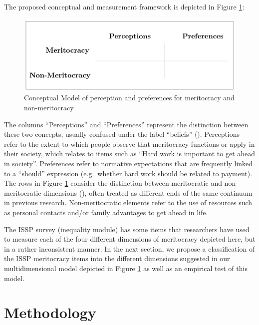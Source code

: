 \documentclass[
  10pt,
  a4paper,
]{article}
\begin{document}
The proposed conceptual and measurement framework is depicted in Figure \ref{fig:merit-model}:

\begin{figure}[H]

{\centering \includegraphics[width=0.85\linewidth]{input/images/Fig1.generalf} 

}

\caption{Conceptual Model of perception and preferences for meritocracy and non-meritocracy}\label{fig:merit-model}
\end{figure}

The columns ``Perceptions'' and ``Preferences'' represent the distinction between these two concepts, usually confused under the label ``beliefs'' (). Perceptions refer to the extent to which people observe that meritocracy functions or apply in their society, which relates to items such as ``Hard work is important to get ahead in society''. Preferences refer to normative expectations that are frequently linked to a ``should'' expression (e.g.~whether hard work should be related to payment). The rows in Figure \ref{fig:merit-model} consider the distinction between meritocratic and non-meritocratic dimensions (), often treated as different ends of the same continuum in previous research. Non-meritocratic elements refer to the use of resources such as personal contacts and/or family advantages to get ahead in life.

The ISSP survey (inequality module) has some items that researchers have used to measure each of the four different dimensions of meritocracy depicted here, but in a rather inconsistent manner. In the next section, we propose a classification of the ISSP meritocracy items into the different dimensions suggested in our multidimensional model depicted in Figure \ref{fig:merit-model} as well as an empirical test of this model.

\section{Methodology}\label{methodology}
\end{document}
